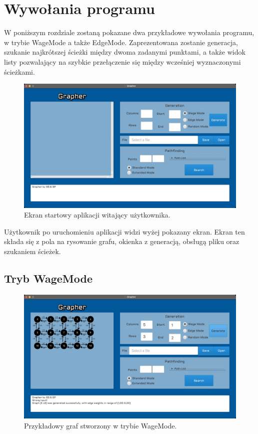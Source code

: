 \documentclass[10pt, a4paper]{report}
\begin{document}
\newpage

\section{Wywołania programu}\label{sec:wywołania-programu}
W poniższym rozdziale zostaną pokazane dwa przykładowe wywołania programu, w trybie WageMode a także EdgeMode.
 Zaprezentowana zostanie generacja, szukanie najkrótszej ścieżki między dwoma zadanymi punktami,
  a także widok listy pozwalający na szybkie przełączenie się między wcześniej wyznaczonymi ścieżkami.

  \begin{figure}[h]
    \begin{center}
        \includegraphics[scale=0.165]{graperStartScreen.jpg}
        \caption{Ekran startowy aplikacji witający użytkownika.}
    \end{center}
  \end{figure}

  Użytkownik po uruchomieniu aplikacji widzi wyżej pokazany ekran. Ekran ten składa się z pola na rysowanie grafu, okienka z generacją, obsługą pliku oraz szukaniem ścieżek.

  \newpage
  \subsection{Tryb WageMode}
  \begin{figure}[h]
    \begin{center}
        \includegraphics[scale=0.165]{grapherWageModeGeneration.jpg}
        \caption{Przykładowy graf stworzony w trybie WageMode.}
    \end{center}
  \end{figure}
\end{document}
